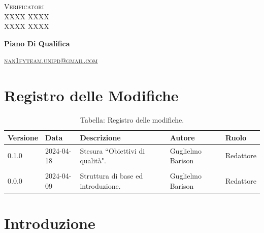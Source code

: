 \documentclass[8pt]{article}
\begin{document}
\begin{titlepage}
\begin{minipage}[t]{0.47\textwidth}
		{\large{\textsc{Verificatori}}
			\vspace{3mm}
			{\\\large{\textsc{XXXX XXXX}\\}} 
			{\large{\textsc{XXXX XXXX}}}
			
		}
		\vspace{4mm}\vspace{4mm}
	\end{minipage}
	\vspace{4cm}
	\begin{center}
		\begin{flushright}
			{\fontsize{30pt}{52pt}\selectfont \textbf{Piano Di Qualifica}} %
		\end{flushright}
		\vspace{3cm}
	\end{center}
	\vspace{10 cm}
	{\small \textsc{\href{mailto: nan1fyteam.unipd@gmail.com}{nan1fyteam.unipd@gmail.com}}}
\end{titlepage}
\pagestyle{mystyle}
\section*{Registro delle Modifiche}
\begin{table}[ht!]	
	\centering
	\begin{tabular}{p{1.2cm} p{2cm} p{6cm} p{3cm} p{2cm}}
		\toprule
		\textbf{Versione}& \textbf{Data} & \textbf{Descrizione} & \textbf{Autore} & \textbf{Ruolo} \\
		\midrule
		0.1.0 & 2024-04-18 & Stesura ``Obiettivi di qualità". & Guglielmo Barison & Redattore \\\\
		0.0.0 & 2024-04-09 & Struttura di base ed introduzione.  & Guglielmo Barison & Redattore \\
		\bottomrule
	\end{tabular}
	\caption*{Tabella: Registro delle modifiche.}
	\label{table:Registro delle modifiche}
\end{table}
\newpage
\tableofcontents
\newpage
\listoffigures
\newpage
\listoftables
\newpage
\justifying
\section{Introduzione}
\end{document}
